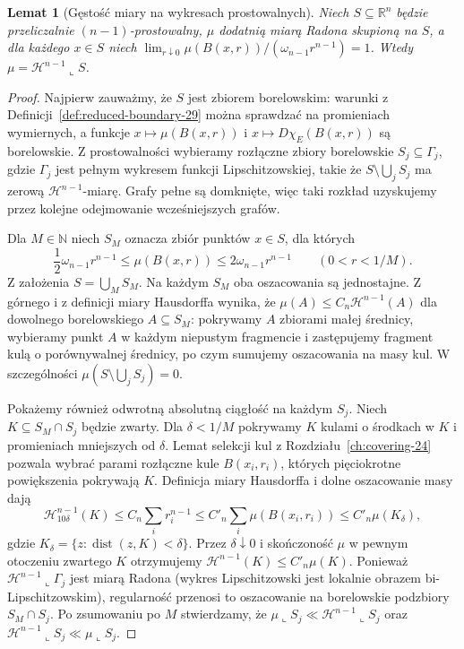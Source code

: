 \documentclass[11pt,a4paper,oneside]{book}
\numberwithin{equation}{chapter}
\theoremstyle{plain}
\newtheorem{lemat}[twierdzenie]{Lemat}
\theoremstyle{definition}
\theoremstyle{remark}
\begin{document}
\begin{lemat}[Gęstość miary na wykresach prostowalnych]
\label{lem:dg-density-identification}
Niech $S\subseteq\mathbb R^n$ będzie przeliczalnie
$(n-1)$-prostowalny, $\mu$ dodatnią miarą Radona
skupioną na $S$, a dla każdego $x\in S$ niech
$\lim_{r\downarrow0}\mu(B(x,r))/
(\omega_{n-1}r^{n-1})=1$.
Wtedy $\mu=\mathcal H^{n-1}\llcorner S$.
\end{lemat}
\begin{proof}
Najpierw zauważmy, że $S$ jest zbiorem borelowskim:
warunki z Definicji~\ref{def:reduced-boundary-29}
można sprawdzać na promieniach wymiernych,
a funkcje $x\mapsto\mu(B(x,r))$ i
$x\mapsto D\chi_E(B(x,r))$ są borelowskie.
Z prostowalności wybieramy rozłączne zbiory
borelowskie $S_j\subseteq\Gamma_j$, gdzie $\Gamma_j$
jest pełnym wykresem funkcji Lipschitzowskiej,
takie że $S\setminus\bigcup_jS_j$ ma zerową
$\mathcal H^{n-1}$-miarę. Grafy pełne są
domknięte, więc taki rozkład uzyskujemy
przez kolejne odejmowanie wcześniejszych grafów.

Dla $M\in\mathbb N$ niech $S_M$ oznacza
zbiór punktów $x\in S$, dla których
\[
 \frac12\omega_{n-1}r^{n-1}
 \le\mu(B(x,r))\le2\omega_{n-1}r^{n-1}
 \qquad(0<r<1/M).
\]
Z założenia $S=\bigcup_MS_M$.
Na każdym $S_M$ oba oszacowania są jednostajne.
Z górnego i z definicji miary Hausdorffa wynika,
że $\mu(A)\le C_n\mathcal H^{n-1}(A)$
dla dowolnego borelowskiego $A\subseteq S_M$:
pokrywamy $A$ zbiorami małej średnicy,
wybieramy punkt $A$ w każdym niepustym
fragmencie i zastępujemy fragment kulą o
porównywalnej średnicy, po czym sumujemy
oszacowania na masy kul. W szczególności
$\mu(S\setminus\bigcup_jS_j)=0$.

Pokażemy również odwrotną absolutną ciągłość
na każdym $S_j$. Niech
$K\subseteq S_M\cap S_j$ będzie zwarty.
Dla $\delta<1/M$ pokrywamy $K$ kulami
o środkach w $K$ i promieniach mniejszych
od $\delta$. Lemat selekcji kul z
Rozdziału~\ref{ch:covering-24} pozwala wybrać
parami rozłączne kule $B(x_i,r_i)$, których
pięciokrotne powiększenia pokrywają $K$.
Definicja miary Hausdorffa i dolne oszacowanie
masy dają
\[
 \mathcal H^{n-1}_{10\delta}(K)
 \le C_n\sum_i r_i^{n-1}
 \le C'_n\sum_i\mu(B(x_i,r_i))
 \le C'_n\mu(K_\delta),
\]
gdzie $K_\delta=\{z:\operatorname{dist}(z,K)<\delta\}$.
Przez $\delta\downarrow0$ i skończoność
$\mu$ w pewnym otoczeniu zwartego $K$
otrzymujemy $\mathcal H^{n-1}(K)\le C'_n\mu(K)$.
Ponieważ $\mathcal H^{n-1}\llcorner\Gamma_j$
jest miarą Radona (wykres Lipschitzowski
jest lokalnie obrazem bi-Lipschitzowskim),
regularność przenosi to oszacowanie na borelowskie
podzbiory $S_M\cap S_j$.
Po zsumowaniu po $M$ stwierdzamy, że
$\mu\llcorner S_j\ll\mathcal H^{n-1}\llcorner S_j$
oraz $\mathcal H^{n-1}\llcorner S_j\ll\mu\llcorner S_j$.


\end{proof}
\end{document}
